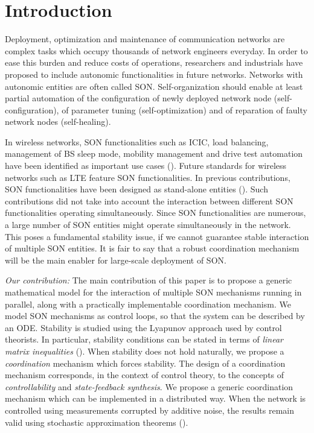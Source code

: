 \documentclass[10pt,conference,letterpaper]{IEEEtran}
\begin{document}
\section{Introduction}
Deployment, optimization and maintenance of communication networks are complex tasks which occupy thousands of network engineers everyday. In order to ease this burden and reduce costs of operations, researchers and industrials have proposed to include autonomic functionalities in future networks. Networks with autonomic entities are often called \ac{SON}. Self-organization should enable at least partial automation of the configuration of newly deployed network node (self-configuration), of parameter tuning (self-optimization) and of reparation of faulty network nodes (self-healing).

In wireless networks, SON functionalities such as \ac{ICIC}, load balancing, management of \ac{BS} sleep mode, mobility management and drive test automation have been identified as important use cases (\cite{3gpp.36.902}). Future standards for wireless networks such as \ac{LTE} feature \ac{SON} functionalities. In previous contributions, \ac{SON} functionalities have been designed as stand-alone entities (\cite{StolyarInfocom2009,CombesPeva2011,CombesInfocom2012,ElayoubiSakerinfocom2011,CombesCNSM2011}). Such contributions did not take into account the interaction between different \ac{SON} functionalities operating simultaneously. Since \ac{SON} functionalities are numerous, a large number of \ac{SON} entities might operate simultaneously in the network. This poses a fundamental stability issue, if we cannot guarantee stable interaction of multiple \ac{SON} entities. It is fair to say that a robust coordination mechanism will be the main enabler for large-scale deployment of \ac{SON}.

\emph{Our contribution:} The main contribution of this paper is to propose a generic mathematical model for the interaction of multiple \ac{SON} mechanisms running in parallel, along with a practically implementable coordination mechanism. We model \ac{SON} mechanisms as control loops, so that the system can be described by an \ac{ODE}. Stability is studied using the Lyapunov approach used by control theorists. In particular, stability conditions can be stated in terms of \emph{linear matrix inequalities} (\cite{LMIControlBoyd}). When stability does not hold naturally, we propose a \emph{coordination} mechanism which forces stability. The design of a coordination mechanism corresponds, in the context of control theory, to the concepts of \emph{controllability} and \emph{state-feedback synthesis}. We propose a generic coordination mechanism which can be implemented in a distributed way. When the network is controlled using measurements corrupted by additive noise, the results remain valid using stochastic approximation theorems (\cite{Kushner}). 
\end{document}
